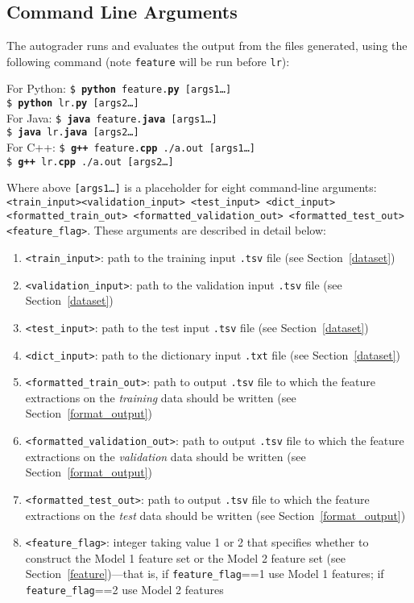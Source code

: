\documentclass[11pt,addpoints,answers]{exam}
\begin{document}
\subsection{Command Line Arguments}
The autograder runs and evaluates the output from the files generated, using the following command (note \lstinline{feature} will be run before \lstinline{lr}):

\begin{tabbing}
For Python: \=\texttt{\$ \textbf{python} feature.\textbf{py} [args1\dots]}\\
\>\texttt{\$ \textbf{python} lr.\textbf{py} [args2\dots]}\\
For Java: \>\texttt{\$ \textbf{java} feature.\textbf{java} [args1\dots]}\\
\>\texttt{\$ \textbf{java} lr.\textbf{java} [args2\dots]}\\
For C++: \>\texttt{\$ \textbf{g++} feature.\textbf{cpp} ./a.out [args1\dots]}\\
\>\texttt{\$ \textbf{g++} lr.\textbf{cpp} ./a.out [args2\dots]}
\end{tabbing}

Where above \texttt{[args1\dots]} is a placeholder for eight command-line arguments: \texttt{<train\_input>}\newline \texttt{<validation\_input> <test\_input> <dict\_input> <formatted\_train\_out> \newline <formatted\_validation\_out>  <formatted\_test\_out> <feature\_flag>}. These arguments are described in detail below:
\begin{enumerate}
    \item \texttt{<train\_input>}: path to the training input \texttt{.tsv} file (see Section~\ref{dataset})
    \item \texttt{<validation\_input>}: path to the validation input \texttt{.tsv} file (see Section~\ref{dataset})
    \item \texttt{<test\_input>}: path to the test input \texttt{.tsv} file (see Section~\ref{dataset})
    \item \texttt{<dict\_input>}: path to the dictionary input \texttt{.txt} file (see Section~\ref{dataset})
    \item \texttt{<formatted\_train\_out>}: path to output \texttt{.tsv} file to which the feature extractions on the \emph{training} data should be written (see Section~\ref{format_output})
    \item \texttt{<formatted\_validation\_out>}: path to output \texttt{.tsv} file to which the feature extractions on the \emph{validation} data should be written (see Section~\ref{format_output})
    \item \texttt{<formatted\_test\_out>}: path to output \texttt{.tsv} file to which the feature extractions on the \emph{test} data should be written (see Section~\ref{format_output})
    \item \texttt{<feature\_flag>}: integer taking value 1 or 2 that specifies whether to construct the Model 1 feature set or the Model 2 feature set (see Section~\ref{feature})---that is, if \lstinline{feature_flag}==1 use Model 1 features; if \lstinline{feature_flag}==2 use Model 2 features
\end{enumerate}
\end{document}

